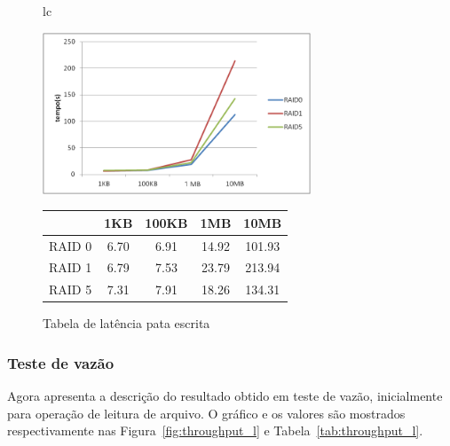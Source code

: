 	\begin{figure}[h]
		\begin{tabular}{lc}
			\begin{minipage}{.50\textwidth}
				\begin{center}
					
					\includegraphics[clip,width=8.0cm]{images/resultados/latencia_escrita.png}
					\caption{Gráfico de latência pata escrita}
					\label{fig:latencia_e}
					
				\end{center}
				
			\end{minipage}
			
			\begin{minipage}{.5\textwidth}
				\makeatletter
				\def\@captype{table}
				\makeatother
				\caption{Tabela de latência pata escrita}
				\label{tab:latencia_e}
				\begin{center}
					\begin{tabular}{|c|c|c|c|c|} \hline
								& 1KB  & 100KB & 1MB   & 10MB \\ \hline
						RAID 0	& 6.70 & 6.91 & 14.92 & 101.93\\ \hline
						RAID 1	& 6.79 & 7.53 & 23.79 & 213.94\\ \hline
						RAID 5	& 7.31 & 7.91 & 18.26 & 134.31\\ \hline
						
					\end{tabular}
					
				\end{center}
			\end{minipage}
		\end{tabular}
	\end{figure}
	
	\subsubsection{Teste de vazão}
	Agora apresenta a descrição do resultado obtido em teste de vazão, inicialmente para operação de leitura de arquivo. O gráfico e os valores são mostrados respectivamente nas Figura~\ref{fig:throughput_l} e Tabela~\ref{tab:throughput_l}.
	\\
	
